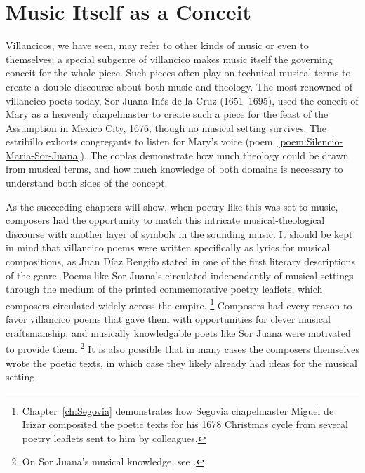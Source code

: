 \section{%
Music Itself as a Conceit
}

Villancicos, we have seen, may refer to other kinds of music or even to themselves; a special subgenre of villancico makes music itself the governing conceit for the whole piece.
Such pieces often play on technical musical terms to create a double discourse about both music and theology.
The most renowned of villancico poets today, Sor Juana Inés de la Cruz (1651--1695), used the conceit of Mary as a heavenly chapelmaster to create such a piece for the feast of the Assumption in Mexico City, 1676, though no musical setting survives.%
	\autocite[no.~220, p.~7]{SorJuana:VC}
The estribillo exhorts congregants to listen for Mary's voice (poem~\ref{poem:Silencio-Maria-Sor-Juana}).
The coplas demonstrate how much theology could be drawn from musical terms, and how much knowledge of both domains is necessary to understand both sides of the concept.

%	

As the succeeding chapters will show, when poetry like this was set to music, composers had the opportunity to match this intricate musical-theological discourse with another layer of symbols in the sounding music.
It should be kept in mind that villancico poems were written specifically as lyrics for musical compositions, as Juan Díaz Rengifo stated in one of the first literary descriptions of the genre.
	\autocite{Rengifo:ArteMetrica}
Poems like Sor Juana's circulated independently of musical settings through the medium of the printed commemorative poetry leaflets, which composers circulated widely across the empire.%
	\footnote{%
	Chapter~\ref{ch:Segovia} demonstrates how Segovia chapelmaster Miguel de Irízar composited the poetic texts for his 1678 Christmas cycle from several poetry leaflets sent to him by colleagues.
	}
Composers had every reason to favor villancico poems that gave them with opportunities for clever musical craftsmanship, and musically knowledgable poets like Sor Juana were motivated to provide them.%
	\footnote{%
	On Sor Juana's musical knowledge, see \autocite{Stevenson:SorJuanaMusicalRapports}.
	}
It is also possible that in many cases the composers themselves wrote the poetic texts, in which case they likely already had ideas for the musical setting.

